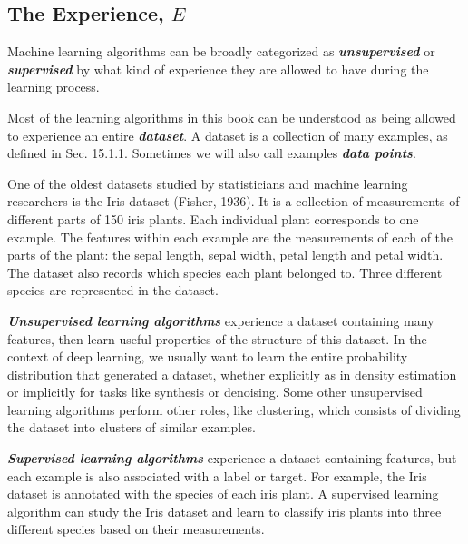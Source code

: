 \documentclass{report}
\begin{document}
\subsection{The Experience, $E$}
\noindent Machine learning algorithms can be broadly categorized as \textbf{\textit{unsupervised}} or \textbf{\textit{supervised}} by what kind of experience they are allowed to have during the learning process.\newline

\noindent Most of the learning algorithms in this book can be understood as being allowed to experience an entire \textbf{\textit{dataset}}. A dataset is a collection of many examples, as defined in Sec. 15.1.1. Sometimes we will also call examples \textbf{\textit{data points}}.\newline

\noindent One of the oldest datasets studied by statisticians and machine learning researchers is the Iris dataset (Fisher, 1936). It is a collection of measurements of different parts of 150 iris plants. Each individual plant corresponds to one example. The features within each example are the measurements of each of the parts of the plant: the sepal length, sepal width, petal length and petal width. The dataset also records which species each plant belonged to. Three different species are represented in the dataset.\newline

\noindent \textbf{\textit{Unsupervised learning algorithms}} experience a dataset containing many features, then learn useful properties of the structure of this dataset. In the context of deep learning, we usually want to learn the entire probability distribution that generated a dataset, whether explicitly as in density estimation or implicitly for tasks like synthesis or denoising. Some other unsupervised learning algorithms perform other roles, like clustering, which consists of dividing the dataset into clusters of similar examples.\newline

\noindent \textbf{\textit{Supervised learning algorithms}} experience a dataset containing features, but each example is also associated with a label or target. For example, the Iris dataset is annotated with the species of each iris plant. A supervised learning algorithm can study the Iris dataset and learn to classify iris plants into three different species based on their measurements.\newline
\end{document}
